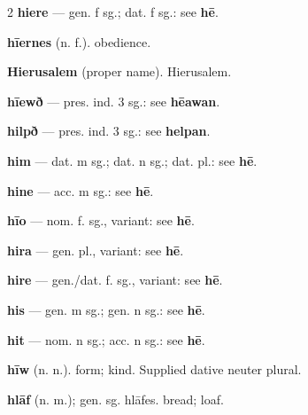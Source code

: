 \begin{multicols*}{2}
\textbf{hiere} — gen. f sg.; dat. f sg.: see \textbf{hē}.\par
\textbf{hīernes} (n. f.). obedience.\par
\textbf{Hierusalem} (proper name). Hierusalem.\par
\textbf{hīewð} — pres. ind. 3 sg.: see \textbf{hēawan}.\par
\textbf{hilpð} — pres. ind. 3 sg.: see \textbf{helpan}.\par
\textbf{him} — dat. m sg.; dat. n sg.; dat. pl.: see \textbf{hē}.\par
\textbf{hine} — acc. m sg.: see \textbf{hē}.\par
\textbf{hīo} — nom. f. sg., variant: see \textbf{hē}.\par
\textbf{hira} — gen. pl., variant: see \textbf{hē}.\par
\textbf{hire} — gen./dat. f. sg., variant: see \textbf{hē}.\par
\textbf{his} — gen. m sg.; gen. n sg.: see \textbf{hē}.\par
\textbf{hit} — nom. n sg.; acc. n sg.: see \textbf{hē}.\par
\textbf{hīw} (n. n.). form; kind. Supplied dative neuter plural.\par
\textbf{hlāf} (n. m.); gen. sg. hlāfes. bread; loaf.\par

\end{multicols*}
